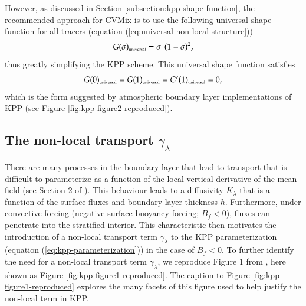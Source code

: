However, as discussed in Section \ref{subsection:kpp-shape-function},
the recommended approach for CVMix is to use the following universal
shape function for all tracers (equation
(\ref{eq:universal-non-local-structure}))
\begin{equation}
 G(\sigma)_{\mbox{\tiny universal}} = \sigma \, \ (1-\sigma)^{2},
\end{equation}
thus greatly simplifying the KPP scheme. This universal shape
function satisfies 
\begin{equation}
 G(0)_{\mbox{\tiny universal}}= G(1)_{\mbox{\tiny universal}} = G'(1)_{\mbox{\tiny universal}} = 0,
\end{equation}
which is the form suggested by atmospheric boundary layer
implementations of KPP (see Figure \ref{fig:kpp-figure2-reproduced}).


\subsection{The non-local transport $\gamma_{\lambda}$}
\label{subsection:kpp-nonlocal-transport-outline}

There are many processes in the boundary layer that lead to transport
that is difficult to parameterize as a function of the local vertical
derivative of the mean field (see Section 2 of \cite{LargeKPP}).  This
behaviour leads to a diffusivity $K_{\lambda}$ that is a function of
the surface fluxes and boundary layer thickness $h$.  Furthermore,
under convective forcing (negative surface buoyancy forcing; $B_{f} <
0$), fluxes can penetrate into the stratified interior.  This
characteristic then motivates the introduction of a non-local
transport term $\gamma_{\lambda}$ to the KPP parameterization
(equation (\ref{eq:kpp-parameterization})) in the case of $B_{f} < 0$.
To further identify the need for a non-local transport term
$\gamma_{\lambda}$, we reproduce Figure 1 from \cite{LargeKPP}, here
shown as Figure \ref{fig:kpp-figure1-reproduced}.  The caption to
Figure \ref{fig:kpp-figure1-reproduced} explores the many facets of
this figure used to help justify the non-local term in KPP.

